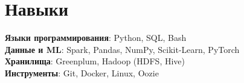 \section{Навыки}
    \begin{itemize}[leftmargin=0.15in, label={}]
	\small{\item{
		 \textbf{Языки программирования}{: Python, SQL, Bash} \\
		 \textbf{Данные и ML}{: Spark, Pandas, NumPy, Scikit-Learn, PyTorch} \\
		 \textbf{Хранилища}{: Greenplum, Hadoop (HDFS, Hive)} \\
		 \textbf{Инструменты}{: Git, Docker, Linux, Oozie} \\
	}}
    \end{itemize}
